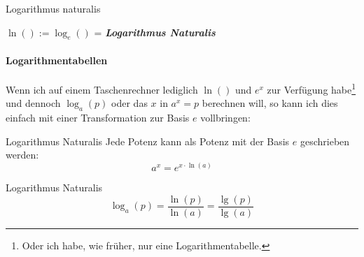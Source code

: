 \begin{definition}{Logarithmus naturalis}{}
  
  $\ln() := \log_e()$ = \textit{\textbf{Logarithmus Naturalis}}
\end{definition}

\paragraph{Logarithmentabellen}
Wenn ich auf einem Taschenrechner lediglich $\ln()$ und $e^x$ zur
Verfügung habe\footnote{Oder ich habe, wie früher, nur eine
Logarithmentabelle.} und dennoch $\log_a(p)$ oder das $x$ in $a^x=p$ berechnen will, so kann ich dies einfach mit einer Transformation zur Basis $e$ vollbringen:

\begin{bemerkung}{Logarithmus Naturalis}{}
  Jede Potenz kann als Potenz mit der Basis $e$ geschrieben werden:
  $$a^x = e^{x\cdot{}\ln(a)}$$
\end{bemerkung}

\begin{gesetz}{Logarithmus Naturalis}{}
$$\log_a(p) = \frac{\ln(p)}{\ln(a)} = \frac{\lg(p)}{\lg(a)}$$
\end{gesetz}

\newpage








